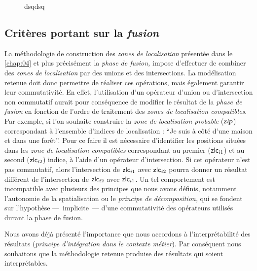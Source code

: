\begin{figure}
  \centering
  
  \caption{dsqdsq}
  \label{fig:temp}
\end{figure}


\subsection{Critères portant sur la \emph{fusion}}



La méthodologie de construction des \emph{zones de localisation}
présentée dans le \autoref{chap:04} et plus précisément la \emph{phase
  de fusion,} impose d'effectuer de combiner des \emph{zones de
  localisation} par des unions et des intersections. La modélisation
retenue doit donc permettre de réaliser ces opérations, mais également
garantir leur commutativité. En effet, l'utilisation d'un opérateur
d'union ou d'intersection non commutatif aurait pour conséquence de
modifier le résultat de la \emph{phase de fusion} en fonction de
l'ordre de traitement des \emph{zones de localisation
  compatibles}. Par exemple, si l'on souhaite construire la \emph{zone
  de localisation probable} ($\text{\textsl{zlp}}$) correspondant à
l'ensemble d'indices de localisation : \enquote{Je suis à côté d'une
  maison et dans une forêt}. Pour ce faire il est nécessaire
d'identifier les positions situées dans les \emph{zone de localisation
  compatibles} correspondant au premier ($\text{\textsf{zlc}}_{i1}$)
et au second ($\text{\textsf{zlc}}_{i2}$) indice, à l'aide d'un
opérateur d'intersection. Si cet opérateur n'est pas commutatif, alors
l'intersection de $\text{\textsf{zlc}}_{i1}$ avec
$\text{\textsf{zlc}}_{i2}$ pourra donner un résultat différent de
l'intersection de $\text{\textsf{zlc}}_{i2}$ avec
$\text{\textsf{zlc}}_{i1}$. Un tel comportement est incompatible avec
plusieurs des principes que nous avons définis, notamment l'autonomie
de la spatialisation ou le \emph{principe de décomposition,} qui se
fondent sur l'hypothèse ---~implicite~--- d'une commutativité des
opérateurs utilisés durant la phase de fusion.


Nous avons déjà présenté l'importance que nous accordons à
l'interprétabilité des résultats (\emph{principe d'intégration dans le
  contexte métier}).
%
Par conséquent nous souhaitons que la méthodologie retenue produise
des résultats qui soient interprétables.

